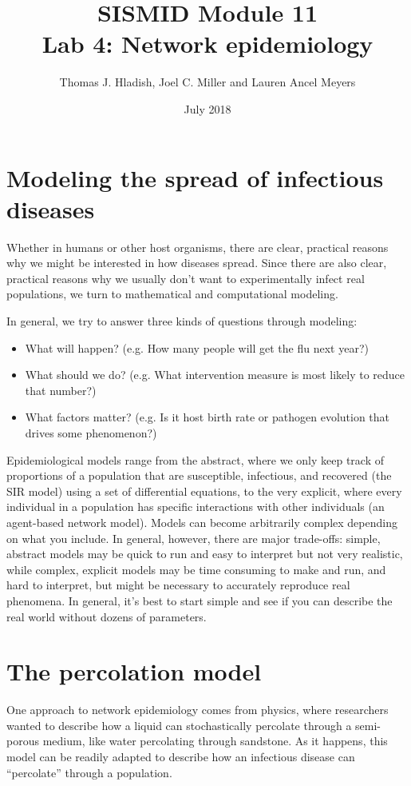 \documentclass{article}
\begin{document}
\title{SISMID Module 11\\Lab 4: Network epidemiology}
\author{Thomas J. Hladish, Joel C. Miller and Lauren Ancel Meyers}
\date{July 2018}
\maketitle


\section*{Modeling the spread of infectious diseases}
Whether in humans or other host organisms, there are clear, practical reasons
why we might be interested in how diseases spread.  Since there are also clear,
practical reasons why we usually don't want to experimentally infect real
populations, we turn to mathematical and computational modeling.

In general, we try to answer three kinds of questions through modeling:
\begin{itemize}
 \item What will happen? (e.g. How many people will get the flu next year?)
 \item What should we do? (e.g. What intervention measure is most likely to
reduce that number?)
 \item What factors matter? (e.g. Is it host birth rate or pathogen evolution
that drives some phenomenon?)
\end{itemize}

Epidemiological models range from the abstract, where we only keep track of
proportions of a population that are susceptible, infectious, and recovered (the
SIR model) using a set of differential equations, to the very explicit, where
every individual in a population has specific interactions with other
individuals (an agent-based network model).  Models can become arbitrarily
complex depending on what you include.  In general, however, there are major
trade-offs: simple, abstract models may be quick to run and easy to interpret but
not very realistic, while complex, explicit models may be time consuming to make
and run, and hard to interpret, but might be necessary to accurately reproduce
real phenomena.  In general, it's best to start simple and see if you can
describe the real world without dozens of parameters.

\section*{The percolation model}
\label{perc}
One approach to network epidemiology comes from physics, where researchers
wanted to describe how a liquid can stochastically percolate through a
semi-porous medium, like water percolating through sandstone.  As it happens,
this model can be readily adapted to describe how an infectious disease can
``percolate'' through a population.
\end{document}
